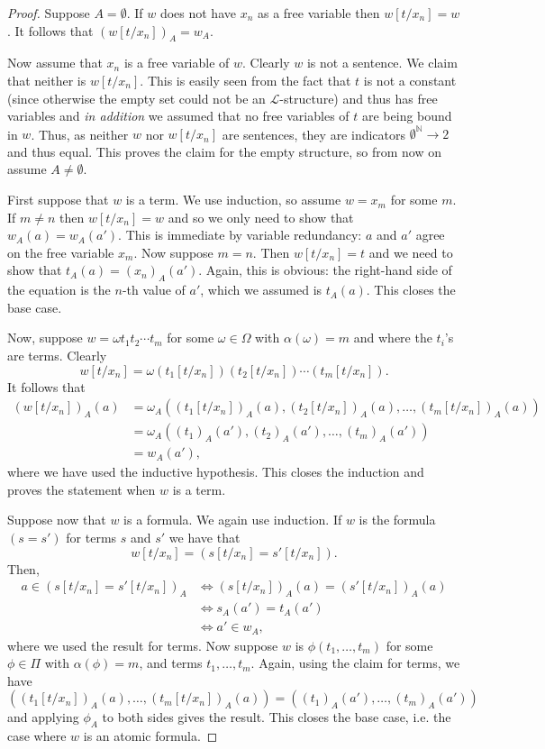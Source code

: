 \documentclass{report}
\theoremstyle{definition}
\theoremstyle{plain}
\theoremstyle{definition}
\begin{document}
	\begin{proof}
		Suppose $A = \emptyset$. If $w$ does not have $x_n$ as a free variable then $w[t/x_n] = w$. It follows that $(w[t/x_n])_A = w_A$.  
		
		Now assume that $x_n$ is a free variable of $w$. Clearly $w$ is not a sentence. We claim that neither is $w[t/x_n]$. This is easily seen from the fact that $t$ is not a constant (since otherwise the empty set could not be an $\mathcal{L}$-structure) and thus has free variables and \emph{in addition} we assumed that no free variables of $t$ are being bound in $w$. Thus, as neither $w$ nor $w[t/x_n]$ are sentences, they are indicators $\emptyset^{\mathbb{N}} \to 2$ and thus equal. This proves the claim for the empty structure, so from now on assume $A\neq \emptyset$.
		
		First suppose that $w$ is a term. We use induction, so assume $w = x_m$ for some $m$. If $m \neq n$ then $w[t/x_n] = w$ and so we only need to show that $w_A(a) = w_A(a')$. This is immediate by variable redundancy: $a$ and $a'$ agree on the free variable $x_m$. Now suppose $m = n$. Then $w[t/x_n] = t$ and we need to show that $t_A(a) = (x_n)_A(a')$. Again, this is obvious: the right-hand side of the equation is the $n$-th value of $a'$, which we assumed is $t_A(a)$. This closes the base case.
		
		Now, suppose $w = \omega t_1 t_2\cdots t_m$ for some $\omega \in \Omega$ with $\alpha(\omega) = m$ and where the $t_i$'s are terms. Clearly 
		\[
		w[t/x_n] = \omega (t_1[t/x_n]) (t_2[t/x_n])\cdots (t_m[t/x_n]).
		\]
		It follows that
		\begin{align*}
			(w[t/x_n])_A(a) &= \omega_A ((t_1[t/x_n])_A(a),(t_2[t/x_n])_A(a),\ldots,(t_m[t/x_n])_A(a))\\
			&= \omega_A((t_1)_A(a'), (t_2)_A(a'),\ldots, (t_m)_A(a'))\\
			&= w_A(a'),
		\end{align*}
		where we have used the inductive hypothesis. This closes the induction and proves the statement when $w$ is a term.
		
		Suppose now that $w$ is a formula. We again use induction. If $w$ is the formula $(s = s')$ for terms $s$ and $s'$ we have that 
		\[
		w[t/x_n] = (s[t/x_n] = s'[t/x_n]).
		\]
		Then,
		\begin{align*}
			a \in (s[t/x_n] = s'[t/x_n])_A &\iff (s[t/x_n])_A(a) = (s'[t/x_n])_A(a)\\
			&\iff s_A(a') = t_A(a')\\
			&\iff a'\in w_A,
		\end{align*}
		where we used the result for terms. Now suppose $w$ is $\phi (t_1,\ldots,t_m)$ for some $\phi \in \Pi$ with $\alpha(\phi) = m$, and terms $t_1,\ldots, t_m$. Again, using the claim for terms, we have 
		\[
		((t_1[t/x_n])_A(a),\ldots,(t_m[t/x_n])_A(a)) = ((t_1)_A(a'),\ldots,(t_m)_A(a'))
		\]
		and applying $\phi_A$ to both sides gives the result. This closes the base case, i.e. the case where $w$ is an atomic formula.
		

\end{proof}
\end{document}
